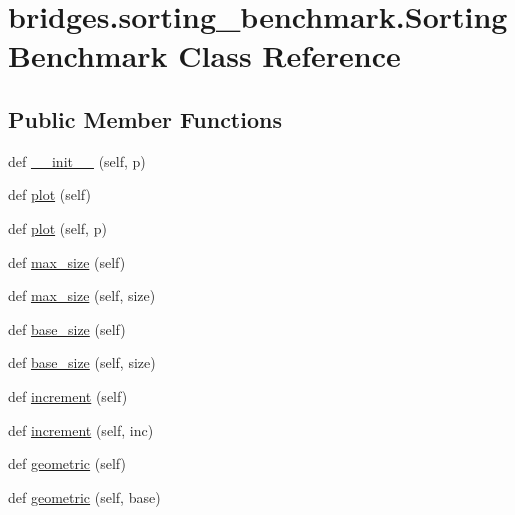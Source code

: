 \hypertarget{classbridges_1_1sorting__benchmark_1_1_sorting_benchmark}{}\section{bridges.\+sorting\+\_\+benchmark.\+Sorting\+Benchmark Class Reference}
\label{classbridges_1_1sorting__benchmark_1_1_sorting_benchmark}
\subsection*{Public Member Functions}
\begin{DoxyCompactItemize}
\item 
def \hyperlink{classbridges_1_1sorting__benchmark_1_1_sorting_benchmark_a703f01c41d21cf5127eeff8918a4adbd}{\+\_\+\+\_\+init\+\_\+\+\_\+} (self, p)
\item 
def \hyperlink{classbridges_1_1sorting__benchmark_1_1_sorting_benchmark_a2cc8cc19c22027fc9b53d2fc13e47a0a}{plot} (self)
\item 
def \hyperlink{classbridges_1_1sorting__benchmark_1_1_sorting_benchmark_a39a40658212ca6ecb39870b6ec135e37}{plot} (self, p)
\item 
def \hyperlink{classbridges_1_1sorting__benchmark_1_1_sorting_benchmark_a14ce3cee6cd2a7233b894abb32cebc06}{max\+\_\+size} (self)
\item 
def \hyperlink{classbridges_1_1sorting__benchmark_1_1_sorting_benchmark_ac315d63ef7b22cf5b4835663bd1cf809}{max\+\_\+size} (self, size)
\item 
def \hyperlink{classbridges_1_1sorting__benchmark_1_1_sorting_benchmark_a77d0f3d1afe635237de0353c372fadea}{base\+\_\+size} (self)
\item 
def \hyperlink{classbridges_1_1sorting__benchmark_1_1_sorting_benchmark_a14aeb9e7fe1b8ca6b9fabc83e68caa6b}{base\+\_\+size} (self, size)
\item 
def \hyperlink{classbridges_1_1sorting__benchmark_1_1_sorting_benchmark_a13b121b5fdecf989544638a94d6498d8}{increment} (self)
\item 
def \hyperlink{classbridges_1_1sorting__benchmark_1_1_sorting_benchmark_a3a2f43cd8fdb9f5ca88bd0ac9e6d0e2e}{increment} (self, inc)
\item 
def \hyperlink{classbridges_1_1sorting__benchmark_1_1_sorting_benchmark_a0ccdd8c0ab411934335c41814325e2c1}{geometric} (self)
\item 
def \hyperlink{classbridges_1_1sorting__benchmark_1_1_sorting_benchmark_a003c4fe5333585f2130609ea24e3eb72}{geometric} (self, base)

\end{DoxyCompactItemize}
